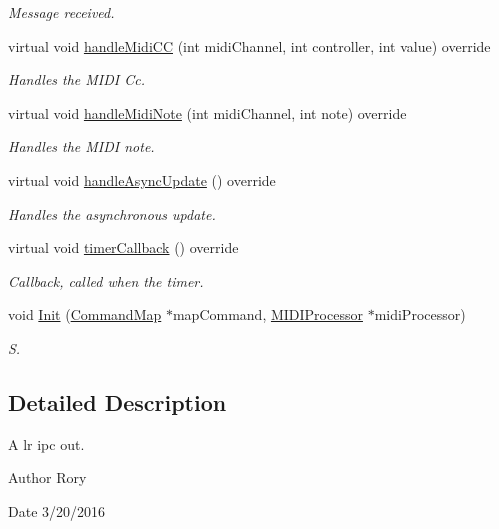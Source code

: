 \begin{DoxyCompactItemize}
\begin{DoxyCompactList}\small\item\em Message received. \end{DoxyCompactList}\item 
virtual void \hyperlink{class_l_r___i_p_c___o_u_t_ad2d2b544157950b3b74ff6f7791c98cc}{handle\+Midi\+CC} (int midi\+Channel, int controller, int value) override
\begin{DoxyCompactList}\small\item\em Handles the M\+I\+DI Cc. \end{DoxyCompactList}\item 
virtual void \hyperlink{class_l_r___i_p_c___o_u_t_ab586f83cf46e3a10ab03a934c749d60d}{handle\+Midi\+Note} (int midi\+Channel, int note) override
\begin{DoxyCompactList}\small\item\em Handles the M\+I\+DI note. \end{DoxyCompactList}\item 
virtual void \hyperlink{class_l_r___i_p_c___o_u_t_ad51f33b2ec43f590ac2d3fc60c129134}{handle\+Async\+Update} () override
\begin{DoxyCompactList}\small\item\em Handles the asynchronous update. \end{DoxyCompactList}\item 
virtual void \hyperlink{class_l_r___i_p_c___o_u_t_ada29129823f7840fef72598342806f53}{timer\+Callback} () override
\begin{DoxyCompactList}\small\item\em Callback, called when the timer. \end{DoxyCompactList}\item 
void \hyperlink{class_l_r___i_p_c___o_u_t_a06ce5d014521c62f6c9f3505894b8b77}{Init} (\hyperlink{class_command_map}{Command\+Map} $\ast$map\+Command, \hyperlink{class_m_i_d_i_processor}{M\+I\+D\+I\+Processor} $\ast$midi\+Processor)
\begin{DoxyCompactList}\small\item\em S. \end{DoxyCompactList}\end{DoxyCompactItemize}


\subsection{Detailed Description}
A lr ipc out. 

\begin{DoxyAuthor}{Author}
Rory 
\end{DoxyAuthor}
\begin{DoxyDate}{Date}
3/20/2016 
\end{DoxyDate}


